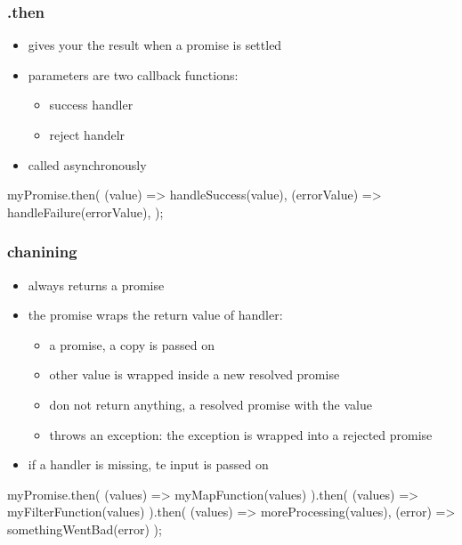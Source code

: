 \begin{frame}[fragile] \frametitle{.then}
\begin{itemize}
  \item {} gives your the result when a promise is settled
  \item parameters are two callback functions:
  \begin{itemize}
    \item success handler
    \item reject handelr
  \end{itemize}
  \item called asynchronously
\end{itemize}
\vspace{5mm}
\begin{CodeBox}{}
myPromise.then(
  (value) => handleSuccess(value),
  (errorValue) => handleFailure(errorValue),
);
\end{CodeBox}
\end{frame}

\begin{frame}[fragile] \frametitle{chanining}
\begin{itemize}
  \item {} always returns a promise
  \item the promise wraps the return value of  handler:
  \begin{itemize}
    \item a promise, a copy is passed on
    \item other value is wrapped inside a new resolved promise
    \item don not return anything, a resolved promise with the value 
    \item throws an exception: the exception is wrapped into a rejected promise
  \end{itemize}
  \item if a handler is missing, te input is passed on
\end{itemize}
\vspace{1mm}
\begin{CodeBox}{}
myPromise.then(
  (values) => myMapFunction(values)
).then(
 (values) => myFilterFunction(values)
).then(
 (values) => moreProcessing(values),
 (error) => somethingWentBad(error)
);
\end{CodeBox}
\end{frame}

